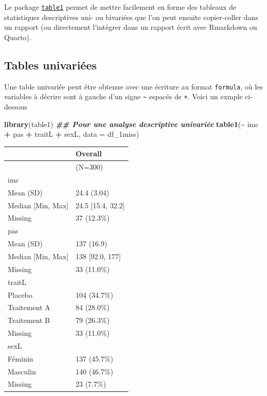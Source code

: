 \documentclass[
]{book}
\newenvironment{Shaded}{\begin{snugshade}}{\end{snugshade}}
\newcommand{\AttributeTok}[1]{\textcolor[rgb]{0.13,0.29,0.53}{#1}}
\newcommand{\DocumentationTok}[1]{\textcolor[rgb]{0.56,0.35,0.01}{\textbf{\textit{#1}}}}
\newcommand{\FunctionTok}[1]{\textcolor[rgb]{0.13,0.29,0.53}{\textbf{#1}}}
\newcommand{\NormalTok}[1]{#1}
\newcommand{\SpecialCharTok}[1]{\textcolor[rgb]{0.81,0.36,0.00}{\textbf{#1}}}
\begin{document}
Le package \href{https://cran.r-project.org/web/packages/table1/vignettes/table1-examples.html}{\texttt{table1}} permet de mettre facilement en forme des tableaux de statistiques descriptives uni- ou bivariées que l'on peut ensuite copier-coller dans un rapport (ou directement l'intégrer dans un rapport écrit avec Rmarkdown ou Quarto).

\subsection{Tables univariées}\label{tables-univariuxe9es}

Une table univariée peut être obtenue avec une écriture au format \texttt{formula}, où les variables à décrire sont à gauche d'un signe \texttt{\textasciitilde{}} espacés de \texttt{+}. Voici un exmple ci-dessous

\begin{Shaded}
\begin{Highlighting}[]
\FunctionTok{library}\NormalTok{(table1)}
\DocumentationTok{\#\# Pour une analyse descriptive univariée}
\FunctionTok{table1}\NormalTok{(}\SpecialCharTok{\textasciitilde{}}\NormalTok{ imc }\SpecialCharTok{+}\NormalTok{ pas }\SpecialCharTok{+}\NormalTok{ traitL }\SpecialCharTok{+}\NormalTok{ sexL, }\AttributeTok{data =}\NormalTok{ df\_1miss)}
\end{Highlighting}
\end{Shaded}

\begin{tabular}{ll}
\toprule
  & Overall\\
\midrule
 & (N=300)\\
imc & \\
Mean (SD) & 24.4 (3.04)\\
Median [Min, Max] & 24.5 [15.4, 32.2]\\
Missing & 37 (12.3\%)\\
\addlinespace
pas & \\
Mean (SD) & 137 (16.9)\\
Median [Min, Max] & 138 [92.0, 177]\\
Missing & 33 (11.0\%)\\
traitL & \\
\addlinespace
Placebo & 104 (34.7\%)\\
Traitement A & 84 (28.0\%)\\
Traitement B & 79 (26.3\%)\\
Missing & 33 (11.0\%)\\
sexL & \\
\addlinespace
Féminin & 137 (45.7\%)\\
Masculin & 140 (46.7\%)\\
Missing & 23 (7.7\%)\\
\bottomrule
\end{tabular}
\end{document}
